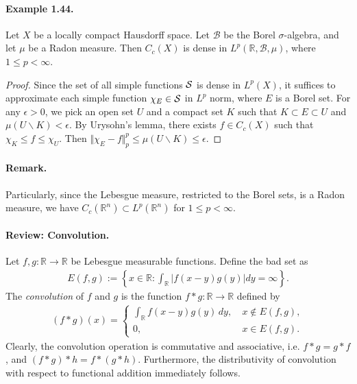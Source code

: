 \documentclass{article}
\begin{document}
\paragraph{Example 1.44.\label{example:1.44}} Let $X$ be a locally compact Hausdorff space. Let $\mathscr{B}$ be the Borel $\sigma$-algebra, and let $\mu$ be a Radon measure. Then $C_c(X)$ is dense in $L^p(\mathbb{R},\mathscr{B},\mu)$, where $1\leq p<\infty$. 
\begin{proof}
Since the set of all simple functions $\cal{S}$ is dense in $L^p(X)$, it suffices to approximate each simple function $\chi_E\in\cal{S}$ in $L^p$ norm, where $E$ is a Borel set. For any $\epsilon>0$, we pick an open set $U$ and a compact set $K$ such that $K\subset E\subset U$ and $\mu(U\backslash K)<\epsilon$. By Urysohn's lemma, there exists $f\in C_c(X)$ such that $\chi_K\leq f\leq\chi_U$. Then $\Vert\chi_E-f\Vert_p^p\leq\mu(U\backslash K)\leq\epsilon$.
\end{proof}

\paragraph{Remark.} Particularly, since the Lebesgue measure, restricted to the Borel sets, is a Radon measure, we have $C_c(\mathbb{R}^n)\subset L^p(\mathbb{R}^n)$ for $1\leq p<\infty$.

\paragraph{Review: Convolution.} Let $f,g:\mathbb{R}\to\mathbb{R}$ be Lebesgue measurable functions. Define the bad set as
\begin{align*}
	E(f,g) := \left\{x\in\mathbb{R}:\int_\mathbb{R}\left\vert f(x-y)g(y)\right\vert dy = \infty\right\}.
\end{align*}
The \textit{convolution} of $f$ and $g$ is the function $f * g:\mathbb{R}\to\mathbb{R}$ defined by
\begin{align*}
	(f*g)(x) = \begin{cases}
		\int_\mathbb{R} f(x-y)g(y)\,dy,\ &x\notin E(f,g),\\
		0,\ &x\in E(f,g).
	\end{cases}
\end{align*}
Clearly, the convolution operation is commutative and associative, i.e. $f*g=g*f$, and $(f*g)*h = f*(g*h)$. Furthermore, the distributivity of convolution with respect to functional addition immediately follows.
\end{document}
